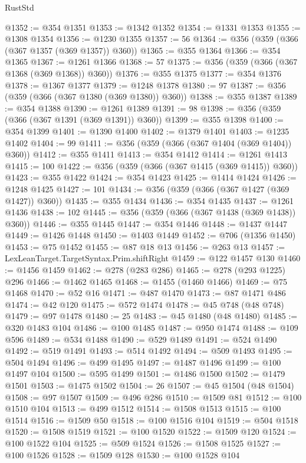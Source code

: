 \begin{lexlean}{RustStd}
\begin{coremodule}
@1352 := @354 @1351
@1353 := @1342 @1352
@1354 := @1331 @1353
@1355 := @1308 @1354
@1356 := @1230 @1355
@1357 := 56
@1364 := @356 (@359 (@366 (@367 @1357 (@369 @1357)) @360))
@1365 := @355 @1364
@1366 := @354 @1365
@1367 := @1261 @1366
@1368 := 57
@1375 := @356 (@359 (@366 (@367 @1368 (@369 @1368)) @360))
@1376 := @355 @1375
@1377 := @354 @1376
@1378 := @1367 @1377
@1379 := @1248 @1378
@1380 := 97
@1387 := @356 (@359 (@366 (@367 @1380 (@369 @1380)) @360))
@1388 := @355 @1387
@1389 := @354 @1388
@1390 := @1261 @1389
@1391 := 98
@1398 := @356 (@359 (@366 (@367 @1391 (@369 @1391)) @360))
@1399 := @355 @1398
@1400 := @354 @1399
@1401 := @1390 @1400
@1402 := @1379 @1401
@1403 := @1235 @1402
@1404 := 99
@1411 := @356 (@359 (@366 (@367 @1404 (@369 @1404)) @360))
@1412 := @355 @1411
@1413 := @354 @1412
@1414 := @1261 @1413
@1415 := 100
@1422 := @356 (@359 (@366 (@367 @1415 (@369 @1415)) @360))
@1423 := @355 @1422
@1424 := @354 @1423
@1425 := @1414 @1424
@1426 := @1248 @1425
@1427 := 101
@1434 := @356 (@359 (@366 (@367 @1427 (@369 @1427)) @360))
@1435 := @355 @1434
@1436 := @354 @1435
@1437 := @1261 @1436
@1438 := 102
@1445 := @356 (@359 (@366 (@367 @1438 (@369 @1438)) @360))
@1446 := @355 @1445
@1447 := @354 @1446
@1448 := @1437 @1447
@1449 := @1426 @1448
@1450 := @1403 @1449
@1452 := @706 (@1356 @1450)
@1453 := @75 @1452
@1455 := @87 @18 @13
@1456 := @263 @13
@1457 := LexLeanTarget.TargetSyntax.Prim.shiftRight
@1459 := @122 @1457 @130
@1460 := @1456 @1459
@1462 := @278 (@283 @286)
@1465 := @278 (@293 @1225) @296
@1466 := @1462 @1465
@1468 := @1455 (@1460 @1466)
@1469 := @75 @1468
@1470 := @52 @16
@1471 := @487 @1470
@1473 := @87 @1471 @486
@1474 := @42 @120
@1475 := @572 @1474
@1478 := @45 @748 (@48 @748)
@1479 := @97 @1478
@1480 := 25
@1483 := @45 @1480 (@48 @1480)
@1485 := @320 @1483 @104
@1486 := @100 @1485
@1487 := @950 @1474
@1488 := @109 @596
@1489 := @534 @1488
@1490 := @529 @1489
@1491 := @524 @1490
@1492 := @519 @1491
@1493 := @514 @1492
@1494 := @509 @1493
@1495 := @504 @1494
@1496 := @499 @1495
@1497 := @1487 @1496
@1499 := @100 @1497 @104
@1500 := @595 @1499
@1501 := @1486 @1500
@1502 := @1479 @1501
@1503 := @1475 @1502
@1504 := 26
@1507 := @45 @1504 (@48 @1504)
@1508 := @97 @1507
@1509 := @496 @286
@1510 := @1509 @81
@1512 := @100 @1510 @104
@1513 := @499 @1512
@1514 := @1508 @1513
@1515 := @100 @1514
@1516 := @1509 @50
@1518 := @100 @1516 @104
@1519 := @504 @1518
@1520 := @1508 @1519
@1521 := @100 @1520
@1522 := @1509 @120
@1524 := @100 @1522 @104
@1525 := @509 @1524
@1526 := @1508 @1525
@1527 := @100 @1526
@1528 := @1509 @128
@1530 := @100 @1528 @104

\end{coremodule}
\end{lexlean}
